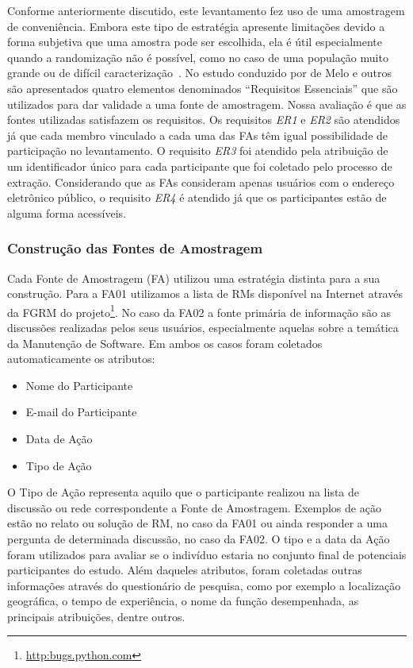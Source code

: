 Conforme anteriormente discutido, este levantamento fez uso de uma amostragem
de conveniência. Embora este tipo de estratégia apresente limitações devido a
forma subjetiva que uma amostra pode ser escolhida, ela é útil especialmente
quando a randomização não é possível, como no caso de uma população muito
grande ou de difícil caracterização~\cite{boxill1997introduction}. No estudo
conduzido por de Melo e outros~\cite{de2014towards} são apresentados quatro
elementos denominados ``Requisitos Essenciais'' que são utilizados para dar
validade a uma fonte de amostragem. Nossa avaliação é que as fontes utilizadas
satisfazem os requisitos. Os requisitos \textit{ER1} e \textit{ER2} são
atendidos já que cada membro vinculado a cada uma das FAs têm igual
possibilidade de participação no levantamento. O requisito \textit{ER3} foi
atendido pela atribuição de um identificador único para cada participante que
foi coletado pelo processo de extração. Considerando que as FAs consideram
apenas usuários com o endereço eletrônico público, o requisito \textit{ER4} é
atendido já que os participantes estão de alguma forma acessíveis.

\subsubsection{Construção das Fontes de Amostragem}\label{subsubsec:construcao_fonte_amostragem}

Cada Fonte de Amostragem (FA) utilizou uma estratégia distinta para a sua
construção. Para a FA01 utilizamos a lista de RMs disponível na Internet através
da FGRM do projeto\footnote{\url{http:bugs.python.com}}. No caso da FA02 a fonte
primária de informação são as discussões realizadas pelos seus usuários,
especialmente aquelas sobre a temática da Manutenção de Software. Em ambos os
casos foram coletados automaticamente os atributos:

\begin{itemize}
	\item Nome do Participante
	\item E-mail do Participante
	\item Data de Ação
	\item Tipo de Ação
\end{itemize}

O Tipo de Ação representa aquilo que o participante realizou na lista de
discussão ou rede correspondente a Fonte de Amostragem. Exemplos de ação estão no
relato ou solução de RM, no caso da FA01 ou ainda responder a uma pergunta de
determinada discussão, no caso da FA02. O tipo e a data da Ação foram utilizados
para avaliar se o indivíduo estaria no conjunto final de potenciais
participantes do estudo. Além daqueles atributos, foram coletadas outras
informações através do questionário de pesquisa, como por exemplo a localização
geográfica, o tempo de experiência, o nome da função desempenhada, as principais
atribuições, dentre outros.

